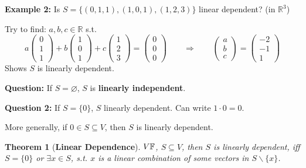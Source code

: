 \documentclass[12pt]{article}
\newtheorem{theorem}{Theorem}[subsection]
\newcommand{\mR}{{\mathbb{R}}}
\newcommand{\mF}{{\mathbb{F}}}
\let\emptyset\varnothing
\begin{document}
	{\color{Brown}
	\textbf{Example 2:} 
	Is $S = \{(0, 1, 1), (1, 0, 1), (1, 2, 3)\}$ linear dependent? (in $\mR^3$)
	
	Try to find: $a,b,c \in \mR$ s.t. 
	\[
		a \begin{pmatrix}
			0\\
			1\\
			1
		\end{pmatrix}
		+ b \begin{pmatrix}
			1\\
			0\\
			1
		\end{pmatrix}
		+ c 	\begin{pmatrix}
			1\\
			2\\
			3
		\end{pmatrix}
		= 
			\begin{pmatrix}
			0\\
			0\\
			0
		\end{pmatrix}
		\qquad \Rightarrow \qquad 	
		\begin{pmatrix}
			a\\
			b\\
			c
		\end{pmatrix} = 
			\begin{pmatrix}
			-2\\
			-1\\
			1
		\end{pmatrix}
	\]
	Shows $S$ is linearly dependent. \\

	}

	\textbf{Question: }
	If $S = \emptyset$, $S$ is \textbf{linearly independent}. 

	\textbf{Question 2: } 
	If $S = \{0\}$, $S$ linearly dependent. Can write $1\cdot 0 = 0$. 

	More generally, if $0 \in S \subseteq V$, then $S$ is linearly dependent.\\ 

	\begin{theorem}[\textbf{Linear Dependence}]
		$V \/ \mF$, $S \subseteq V$, then $S$ is linearly dependent, iff 
		$S = \{0\}$ or $\exists x \in S$, s.t. $x$ is a linear combination
		of some vectors in $S\backslash \{x\}$. 
	\end{theorem}






\newpage
\end{document}
